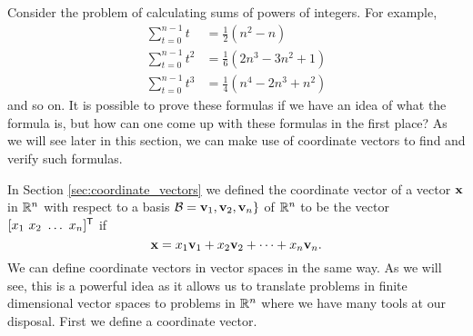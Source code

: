   \label{chap:coordinate_vectors_vector_spaces}

\vspace*{-17 pt}

\vspace*{13 pt}

\label{sec:appl_sums}

Consider the problem of calculating sums of powers of integers. For example, 
\begin{align*}
\sum_{t=0}^{n-1} t &= \frac{1}{2}\left(n^2-n\right) \\
\sum_{t=0}^{n-1} t^2 &= \frac{1}{6}\left(2n^3-3n^2+1\right) \\
\sum_{t=0}^{n-1} t^3 &= \frac{1}{4}\left(n^4-2n^3+n^2\right) 
\end{align*}
and so on. It is possible to prove these formulas if we have an idea of what the formula is, but how can one come up with these formulas in the first place? As we will see later in this section, we can make use of coordinate vectors to find and verify such formulas. 

\label{sec:coor_vec_intro}

In Section \ref{sec:coordinate_vectors} we defined the coordinate vector of a vector $\mathbf{x}$ in $\mathbb{R}^n$ with respect to a basis $\mathcal{B} = \mathbf{v}_1, \mathbf{v}_2, \mathbf{v}_n\}$ of $\mathbb{R}^n$ to be the vector $[x_1 \ x_2 \ \ldots \ x_n]^{\mathsf{T}}$ if 
\[\mathbf{x} = x_1 \mathbf{v}_1 + x_2 \mathbf{v}_2 + \cdots + x_n \mathbf{v}_n.\]
We can define coordinate vectors in vector spaces in the same way. As we will see, this is a powerful idea as it allows us to translate problems in finite dimensional vector spaces to problems in $\mathbb{R}^n$ where we have many tools at our disposal. First we define a coordinate vector.

